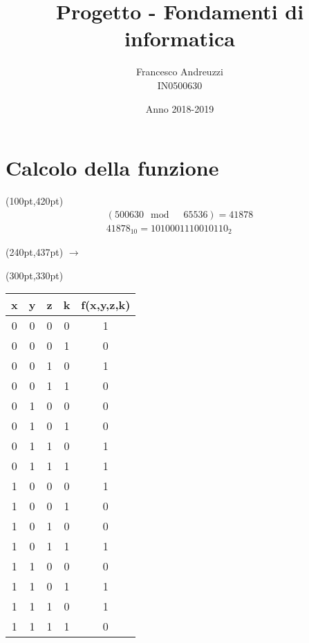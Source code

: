\documentclass{article}
\begin{document}
\author{Francesco Andreuzzi\\ IN0500630}
\title{Progetto - Fondamenti di informatica}
\date{Anno 2018-2019}
\maketitle

\section{Calcolo della funzione}

\begin{textblock*}{10pt}(100pt,420pt)
  \begin{gather*}
    (500630 \mod \quad 65536) = 41878\\
    41878_{10} = 1010001110010110_2
  \end{gather*}
\end{textblock*}

\begin{textblock*}{10pt}(240pt,437pt)
  \Huge{$\rightarrow$}
\end{textblock*}

\begin{textblock*}{10pt}(300pt,330pt)
  \begin{tabular}{|c|c|c|c|c|}
    \hline
    \textbf{x} & \textbf{y} & \textbf{z} & \textbf{k} & \textbf{f(x,y,z,k)} \\
    \hline
      0 & 0 & 0 & 0 & 1 \\
    \hline
      0 & 0 & 0 & 1 & 0 \\
    \hline
      0 & 0 & 1 & 0 & 1 \\
    \hline
      0 & 0 & 1 & 1 & 0 \\
    \hline
      0 & 1 & 0 & 0 & 0 \\
    \hline
      0 & 1 & 0 & 1 & 0 \\
    \hline
      0 & 1 & 1 & 0 & 1 \\
    \hline
      0 & 1 & 1 & 1 & 1 \\
    \hline
      1 & 0 & 0 & 0 & 1 \\
    \hline
      1 & 0 & 0 & 1 & 0 \\
    \hline
      1 & 0 & 1 & 0 & 0 \\
    \hline
      1 & 0 & 1 & 1 & 1 \\
    \hline
      1 & 1 & 0 & 0 & 0 \\
    \hline
      1 & 1 & 0 & 1 & 1 \\
    \hline
      1 & 1 & 1 & 0 & 1 \\
    \hline
      1 & 1 & 1 & 1 & 0 \\
    \hline
  \end{tabular}
\end{textblock*}
\end{document}
